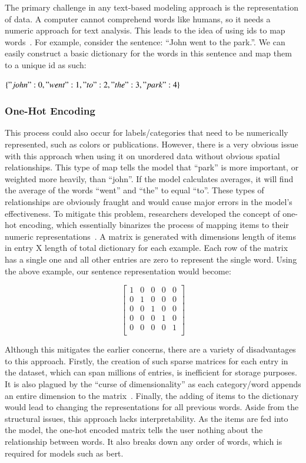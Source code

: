 The primary challenge in any text-based modeling approach is the representation of data. A computer cannot comprehend words like humans, so it needs a numeric approach for text analysis. This leads to the idea of using ids to map words~\parencite{nlpfundamentals}. For example, consider the sentence: “John went to the park.”. We can easily construct a basic dictionary for the words in this sentence and map them to a unique id as such: 

$\{"john" : 0, "went" : 1, "to" : 2, "the" : 3, "park" : 4\}$

\subsubsection{One-Hot Encoding}
This process could also occur for labels/categories that need to be numerically represented, such as colors or publications. However, there is a very obvious issue with this approach when using it on unordered data without obvious spatial relationships. This type of map tells the model that “park” is more important, or weighted more heavily, than “john”. If the model calculates averages, it will find the average of the words “went” and “the” to equal “to”. These types of relationships are obviously fraught and would cause major errors in the model’s effectiveness. To mitigate this problem, researchers developed the concept of one-hot encoding, which essentially binarizes the process of mapping items to their numeric representations~\parencite{harris_harris_2015}. A matrix is generated with dimensions length of items in entry X length of total dictionary for each example. Each row of the matrix has a single one and all other entries are zero to represent the single word. Using the above example, our sentence representation would become:

\[\begin{bmatrix}
1 & 0 & 0 & 0 & 0\\
0 & 1 & 0 & 0 & 0\\
0 & 0 & 1 & 0 & 0\\
0 & 0 & 0 & 1 & 0\\
0 & 0 & 0 & 0 & 1\\
\end{bmatrix}\]

Although this mitigates the earlier concerns, there are a variety of disadvantages to this approach. Firstly, the creation of such sparse matrices for each entry in the dataset, which can span millions of entries, is inefficient for storage purposes. It is also plagued by the “curse of dimensionality” as each category/word appends an entire dimension to the matrix~\parencite{bellman_1954}. Finally, the adding of items to the dictionary would lead to changing the representations for all previous words. Aside from the structural issues, this approach lacks interpretability. As the items are fed into the model, the one-hot encoded matrix tells the user nothing about the relationship between words. It also breaks down any order of words, which is required for models such as \acrshort{bert}.

